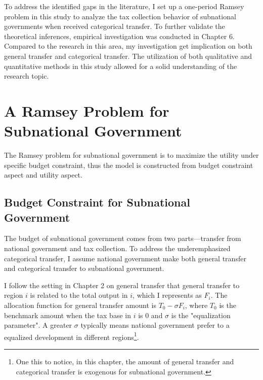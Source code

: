 To address the identified gaps in the literature, I set up a one-period Ramsey problem in this study to analyze the tax collection behavior of subnational governments when received categorical transfer.  To further validate the theoretical inferences, empirical investigation was conducted in Chapter 6. Compared to the research in this area, my investigation get implication on both general transfer and categorical transfer. The utilization of both qualitative and quantitative methods in this study allowed for a solid understanding of the research topic.

\section{A Ramsey Problem for Subnational Government}
The Ramsey problem for subnational government is to maximize the utility under specific budget constraint, thus the model is constructed from budget constraint aspect and utility aspect.

\subsection{Budget Constraint for Subnational Government}

The budget of subnational government comes from two parts---transfer from national government and tax collection. To address the underemphasized categorical transfer, I assume national government make both general transfer and categorical transfer to subnational government.

I follow the setting in Chapter 2 on general transfer that general transfer to region $i$ is related to the total output in $i$, which I represents as $F_i$. The allocation function for general transfer amount is $T_0-\sigma F_i$, where $T_0$ is the benchmark amount when the tax base in $i$ is 0 and $\sigma$ is the "equalization parameter". A greater $\sigma$ typically means national government prefer to a equalized development in different regions\footnote{One this to notice, in this chapter, the amount of general transfer and categorical transfer is exogenous for subnational government.}.

